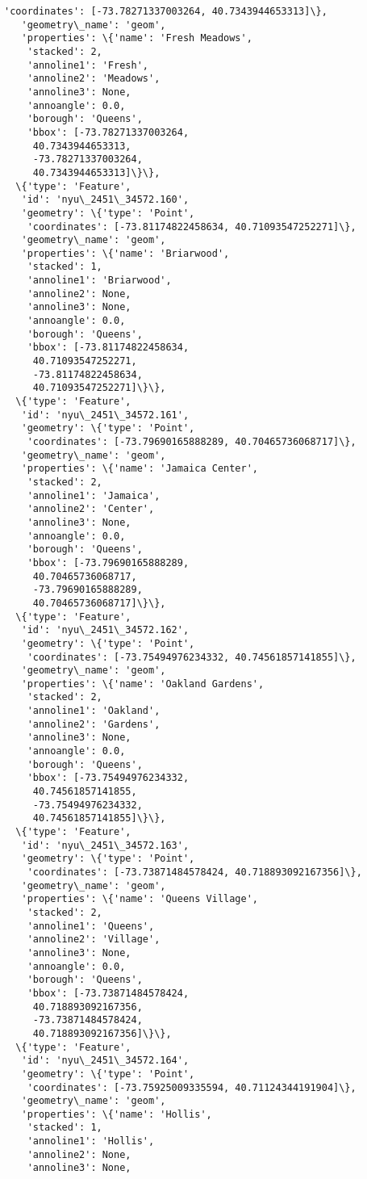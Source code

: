 \documentclass[11pt]{article}
\begin{document}
\begin{tcolorbox}[breakable, size=fbox, boxrule=.5pt, pad at break*=1mm, opacityfill=0]
\begin{Verbatim}[commandchars=\\\{\}]
    'coordinates': [-73.78271337003264, 40.7343944653313]\},
   'geometry\_name': 'geom',
   'properties': \{'name': 'Fresh Meadows',
    'stacked': 2,
    'annoline1': 'Fresh',
    'annoline2': 'Meadows',
    'annoline3': None,
    'annoangle': 0.0,
    'borough': 'Queens',
    'bbox': [-73.78271337003264,
     40.7343944653313,
     -73.78271337003264,
     40.7343944653313]\}\},
  \{'type': 'Feature',
   'id': 'nyu\_2451\_34572.160',
   'geometry': \{'type': 'Point',
    'coordinates': [-73.81174822458634, 40.71093547252271]\},
   'geometry\_name': 'geom',
   'properties': \{'name': 'Briarwood',
    'stacked': 1,
    'annoline1': 'Briarwood',
    'annoline2': None,
    'annoline3': None,
    'annoangle': 0.0,
    'borough': 'Queens',
    'bbox': [-73.81174822458634,
     40.71093547252271,
     -73.81174822458634,
     40.71093547252271]\}\},
  \{'type': 'Feature',
   'id': 'nyu\_2451\_34572.161',
   'geometry': \{'type': 'Point',
    'coordinates': [-73.79690165888289, 40.70465736068717]\},
   'geometry\_name': 'geom',
   'properties': \{'name': 'Jamaica Center',
    'stacked': 2,
    'annoline1': 'Jamaica',
    'annoline2': 'Center',
    'annoline3': None,
    'annoangle': 0.0,
    'borough': 'Queens',
    'bbox': [-73.79690165888289,
     40.70465736068717,
     -73.79690165888289,
     40.70465736068717]\}\},
  \{'type': 'Feature',
   'id': 'nyu\_2451\_34572.162',
   'geometry': \{'type': 'Point',
    'coordinates': [-73.75494976234332, 40.74561857141855]\},
   'geometry\_name': 'geom',
   'properties': \{'name': 'Oakland Gardens',
    'stacked': 2,
    'annoline1': 'Oakland',
    'annoline2': 'Gardens',
    'annoline3': None,
    'annoangle': 0.0,
    'borough': 'Queens',
    'bbox': [-73.75494976234332,
     40.74561857141855,
     -73.75494976234332,
     40.74561857141855]\}\},
  \{'type': 'Feature',
   'id': 'nyu\_2451\_34572.163',
   'geometry': \{'type': 'Point',
    'coordinates': [-73.73871484578424, 40.718893092167356]\},
   'geometry\_name': 'geom',
   'properties': \{'name': 'Queens Village',
    'stacked': 2,
    'annoline1': 'Queens',
    'annoline2': 'Village',
    'annoline3': None,
    'annoangle': 0.0,
    'borough': 'Queens',
    'bbox': [-73.73871484578424,
     40.718893092167356,
     -73.73871484578424,
     40.718893092167356]\}\},
  \{'type': 'Feature',
   'id': 'nyu\_2451\_34572.164',
   'geometry': \{'type': 'Point',
    'coordinates': [-73.75925009335594, 40.71124344191904]\},
   'geometry\_name': 'geom',
   'properties': \{'name': 'Hollis',
    'stacked': 1,
    'annoline1': 'Hollis',
    'annoline2': None,
    'annoline3': None,

\end{Verbatim}
\end{tcolorbox}
\end{document}
